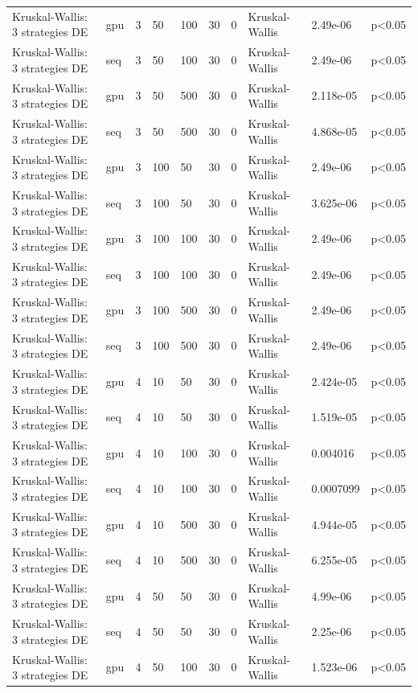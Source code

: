 \begin{table}[t]
\begin{tabular}{llllllllll}
Kruskal-Wallis: 3 strategies DE & gpu & 3 & 50 & 100 & 30 & 0 & Kruskal-Wallis & 2.49e-06 & p<0.05 \\
Kruskal-Wallis: 3 strategies DE & seq & 3 & 50 & 100 & 30 & 0 & Kruskal-Wallis & 2.49e-06 & p<0.05 \\
Kruskal-Wallis: 3 strategies DE & gpu & 3 & 50 & 500 & 30 & 0 & Kruskal-Wallis & 2.118e-05 & p<0.05 \\
Kruskal-Wallis: 3 strategies DE & seq & 3 & 50 & 500 & 30 & 0 & Kruskal-Wallis & 4.868e-05 & p<0.05 \\
Kruskal-Wallis: 3 strategies DE & gpu & 3 & 100 & 50 & 30 & 0 & Kruskal-Wallis & 2.49e-06 & p<0.05 \\
Kruskal-Wallis: 3 strategies DE & seq & 3 & 100 & 50 & 30 & 0 & Kruskal-Wallis & 3.625e-06 & p<0.05 \\
Kruskal-Wallis: 3 strategies DE & gpu & 3 & 100 & 100 & 30 & 0 & Kruskal-Wallis & 2.49e-06 & p<0.05 \\
Kruskal-Wallis: 3 strategies DE & seq & 3 & 100 & 100 & 30 & 0 & Kruskal-Wallis & 2.49e-06 & p<0.05 \\
Kruskal-Wallis: 3 strategies DE & gpu & 3 & 100 & 500 & 30 & 0 & Kruskal-Wallis & 2.49e-06 & p<0.05 \\
Kruskal-Wallis: 3 strategies DE & seq & 3 & 100 & 500 & 30 & 0 & Kruskal-Wallis & 2.49e-06 & p<0.05 \\
Kruskal-Wallis: 3 strategies DE & gpu & 4 & 10 & 50 & 30 & 0 & Kruskal-Wallis & 2.424e-05 & p<0.05 \\
Kruskal-Wallis: 3 strategies DE & seq & 4 & 10 & 50 & 30 & 0 & Kruskal-Wallis & 1.519e-05 & p<0.05 \\
Kruskal-Wallis: 3 strategies DE & gpu & 4 & 10 & 100 & 30 & 0 & Kruskal-Wallis & 0.004016 & p<0.05 \\
Kruskal-Wallis: 3 strategies DE & seq & 4 & 10 & 100 & 30 & 0 & Kruskal-Wallis & 0.0007099 & p<0.05 \\
Kruskal-Wallis: 3 strategies DE & gpu & 4 & 10 & 500 & 30 & 0 & Kruskal-Wallis & 4.944e-05 & p<0.05 \\
Kruskal-Wallis: 3 strategies DE & seq & 4 & 10 & 500 & 30 & 0 & Kruskal-Wallis & 6.255e-05 & p<0.05 \\
Kruskal-Wallis: 3 strategies DE & gpu & 4 & 50 & 50 & 30 & 0 & Kruskal-Wallis & 4.99e-06 & p<0.05 \\
Kruskal-Wallis: 3 strategies DE & seq & 4 & 50 & 50 & 30 & 0 & Kruskal-Wallis & 2.25e-06 & p<0.05 \\
Kruskal-Wallis: 3 strategies DE & gpu & 4 & 50 & 100 & 30 & 0 & Kruskal-Wallis & 1.523e-06 & p<0.05 \\

\end{tabular}
\end{table}
